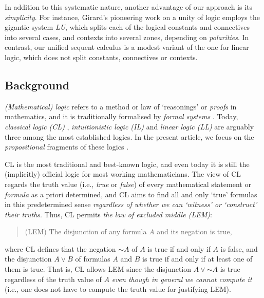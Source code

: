 \documentclass[a4paper]{article}
\theoremstyle{definition}
\theoremstyle{theorem}
\theoremstyle{remark}
\begin{document}

In addition to this systematic nature, another advantage of our approach is its \emph{simplicity}.
For instance, Girard's pioneering work on a unity of logic \cite{girard1993unity} employs the gigantic system \emph{\textsf{LU}}, which splits each of the logical constants and connectives into several cases, and contexts into several zones, depending on \emph{polarities}.
In contrast, our unified sequent calculus is a modest variant of the one for linear logic, which does not split constants, connectives or contexts.












\subsection{Background}
\label{Background}
\emph{(Mathematical) logic} refers to a method or law of `reasonings' or \emph{proofs} in mathematics, and it is traditionally formalised by \emph{formal systems} \cite{troelstra2000basic}.
Today, \emph{classical logic (CL)} \cite{frege1879begriffsschrift,troelstra2000basic}, \emph{intuitionistic logic (IL)} \cite{heyting1930formalen,troelstra1988constructivism,troelstra2000basic} and \emph{linear logic (LL)} \cite{girard1987linear} are arguably three among the most established logics.
In the present article, we focus on the \emph{propositional} fragments of these logics \cite{troelstra2000basic}.

CL is the most traditional and best-known logic, and even today it is still the (implicitly) official logic for most working mathematicians.
The view of CL regards the truth value (i.e., \emph{true} or \emph{false}) of every mathematical statement or \emph{formula} as a priori determined, and CL aims to find all and only `true' formulas in this predetermined sense \emph{regardless of whether we can `witness' or `construct' their truths}.
Thus, CL permits \emph{the law of excluded middle (LEM)}:
\begin{quote}
\textsc{(LEM)} The disjunction of any formula $A$ and its negation is true,
\end{quote}
where CL defines that the negation $\mathbin{\sim} A$ of $A$ is true if and only if $A$ is false, and the disjunction $A \vee B$ of formulas $A$ and $B$ is true if and only if at least one of them is true.
That is, CL allows LEM since the disjunction $A \vee \mathbin{\sim} A$ is true regardless of the truth value of $A$ \emph{even though in general we cannot compute it} \cite{rogers1987theory} (i.e., one does not have to compute the truth value for justifying LEM).
\end{document}
